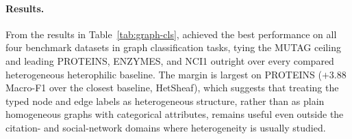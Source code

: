 \paragraph{Results.}

From the results in Table~\ref{tab:graph-cls}, \method{} achieved the best performance on all four benchmark datasets in graph classification tasks, tying the MUTAG ceiling and leading PROTEINS, ENZYMES, and NCI1 outright over every compared heterogeneous heterophilic baseline. The margin is largest on PROTEINS ($+3.88$ Macro-F1 over the closest baseline, HetSheaf), which suggests that treating the typed node and edge labels as heterogeneous structure, rather than as plain homogeneous graphs with categorical attributes, remains useful even outside the citation- and social-network domains where heterogeneity is usually studied.


